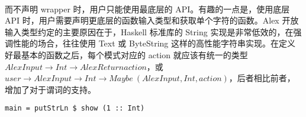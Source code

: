 \documentclass{article}
\begin{document}
	\paragraph{}
	而不声明 wrapper 时，用户只能使用最底层的 API。有趣的一点是，使用底层 API 时，用户需要声明更底层的函数输入类型和获取单个字符的函数。Alex 开放输入类型约定的主要原因在于，Haskell 标准库的 String 实现是非常低效的，在强调性能的场合，往往使用 Text 或 ByteString 这样的高性能字符串实现。在定义好最基本的函数之后，每个模式对应的 action 就应该有统一的类型 $AlexInput \to Int \to AlexReturn action$，或 $user \to AlexInput \to Int \to Maybe\ (AlexInput, Int, action)$，后者相比前者，增加了对于谓词的支持。
	\begin{verbatim}
main = putStrLn $ show (1 :: Int)
	\end{verbatim}
	\printbibliography
\end{document}
